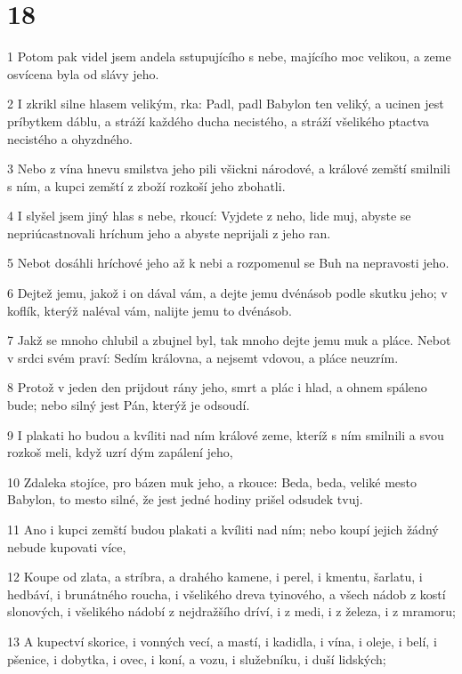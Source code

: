 \chapter{18}

\par 1 Potom pak videl jsem andela sstupujícího s nebe, majícího moc velikou, a zeme osvícena byla od slávy jeho.
\par 2 I zkrikl silne hlasem velikým, rka: Padl, padl Babylon ten veliký, a ucinen jest príbytkem dáblu, a stráží každého ducha necistého, a stráží všelikého ptactva necistého a ohyzdného.
\par 3 Nebo z vína hnevu smilstva jeho pili všickni národové, a králové zemští smilnili s ním, a kupci zemští z zboží rozkoší jeho zbohatli.
\par 4 I slyšel jsem jiný hlas s nebe, rkoucí: Vyjdete z neho, lide muj, abyste se nepriúcastnovali hríchum jeho a abyste neprijali z jeho ran.
\par 5 Nebot dosáhli hríchové jeho až k nebi a rozpomenul se Buh na nepravosti jeho.
\par 6 Dejtež jemu, jakož i on dával vám, a dejte jemu dvénásob podle skutku jeho; v koflík, kterýž naléval vám, nalijte jemu to dvénásob.
\par 7 Jakž se mnoho chlubil a zbujnel byl, tak mnoho dejte jemu muk a pláce. Nebot v srdci svém praví: Sedím královna, a nejsemt vdovou, a pláce neuzrím.
\par 8 Protož v jeden den prijdout rány jeho, smrt a plác i hlad, a ohnem spáleno bude; nebo silný jest Pán, kterýž je odsoudí.
\par 9 I plakati ho budou a kvíliti nad ním králové zeme, kteríž s ním smilnili a svou rozkoš meli, když uzrí dým zapálení jeho,
\par 10 Zdaleka stojíce, pro bázen muk jeho, a rkouce: Beda, beda, veliké mesto Babylon, to mesto silné, že jest jedné hodiny prišel odsudek tvuj.
\par 11 Ano i kupci zemští budou plakati a kvíliti nad ním; nebo koupí jejich žádný nebude kupovati více,
\par 12 Koupe od zlata, a stríbra, a drahého kamene, i perel, i kmentu, šarlatu, i hedbáví, i brunátného roucha, i všelikého dreva tyinového, a všech nádob z kostí slonových, i všelikého nádobí z nejdražšího dríví, i z medi, i z železa, i z mramoru;
\par 13 A kupectví skorice, i vonných vecí, a mastí, i kadidla, i vína, i oleje, i belí, i pšenice, i dobytka, i ovec, i koní, a vozu, i služebníku, i duší lidských;
